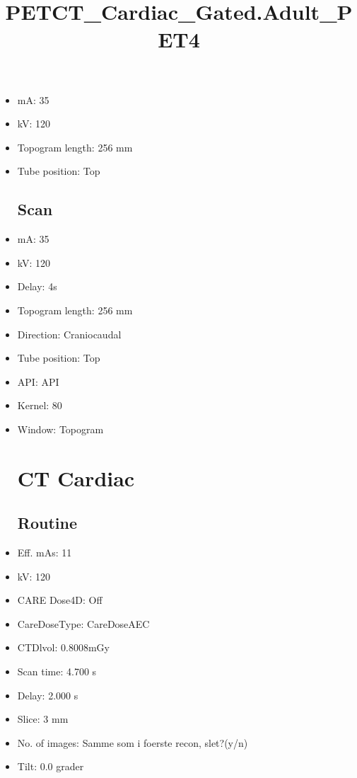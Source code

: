 \documentclass[12pt]{article}
\title{PETCT\_Cardiac\_Gated.Adult\_PET4}
\begin{document}
\maketitle
\newpage
\tableofcontents
\newpage
{}


\begin{itemize}\section{Topogram}
\subsection{Routine}
\item mA: 35\item kV: 120\item Topogram length: 256 mm\item Tube position: Top
\subsection{Scan}\item mA: 35\item kV: 120\item Delay: 4s\item Topogram length: 256 mm\item Direction: Craniocaudal\item Tube position: Top\item API: API \item Kernel: 80\item Window: Topogram
\section{CT Cardiac}
\subsection{Routine}
\item Eff. mAs: 11\item kV: 120\item CARE Dose4D: Off\item CareDoseType: CareDoseAEC\item CTDlvol: 0.8008mGy\item Scan time: 4.700 s\item Delay: 2.000 s\item Slice: 3 mm\item No. of images: Samme som i foerste recon, slet?(y/n)\item Tilt: 0.0 grader

\end{itemize}
\end{document}
